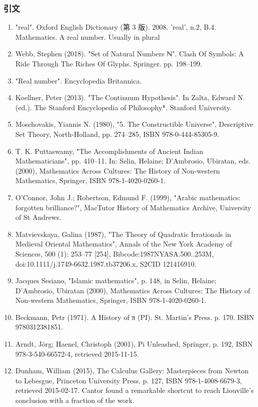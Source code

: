 \subsubsection{引文}
\begin{enumerate}
\item "real". Oxford English Dictionary (第 3 版). 2008. 'real', n.2, B.4. Mathematics. A real number. Usually in plural
\item Webb, Stephen (2018). "Set of Natural Numbers ℕ". Clash Of Symbols: A Ride Through The Riches Of Glyphs. Springer. pp. 198–199.
\item "Real number". Encyclopedia Britannica.
\item Koellner, Peter (2013). "The Continuum Hypothesis". In Zalta, Edward N. (ed.). The Stanford Encyclopedia of Philosophy*. Stanford University.
\item Moschovakis, Yiannis N. (1980), "5. The Constructible Universe", Descriptive Set Theory, North-Holland, pp. 274–285, ISBN 978-0-444-85305-9.
\item T. K. Puttaswamy, "The Accomplishments of Ancient Indian Mathematicians", pp. 410–11. In: Selin, Helaine; D'Ambrosio, Ubiratan, eds. (2000), Mathematics Across Cultures: The History of Non-western Mathematics, Springer, ISBN 978-1-4020-0260-1.
\item O'Connor, John J.; Robertson, Edmund F. (1999), "Arabic mathematics: forgotten brilliance?", MacTutor History of Mathematics Archive, University of St Andrews.
\item Matvievskaya, Galina (1987), "The Theory of Quadratic Irrationals in Medieval Oriental Mathematics", Annals of the New York Academy of Sciences, 500 (1): 253–77 [254], Bibcode:1987NYASA.500..253M, doi:10.1111/j.1749-6632.1987.tb37206.x, S2CID 121416910.
\item Jacques Sesiano, "Islamic mathematics", p. 148, in Selin, Helaine; D'Ambrosio, Ubiratan (2000), Mathematics Across Cultures: The History of Non-western Mathematics, Springer, ISBN 978-1-4020-0260-1.
\item Beckmann, Petr (1971). A History of π (PI). St. Martin's Press. p. 170. ISBN 9780312381851.
\item Arndt, Jörg; Haenel, Christoph (2001), Pi Unleashed, Springer, p. 192, ISBN 978-3-540-66572-4, retrieved 2015-11-15.
\item Dunham, William (2015), The Calculus Gallery: Masterpieces from Newton to Lebesgue, Princeton University Press, p. 127, ISBN 978-1-4008-6679-3, retrieved 2015-02-17. Cantor found a remarkable shortcut to reach Liouville's conclusion with a fraction of the work.

\end{enumerate}
